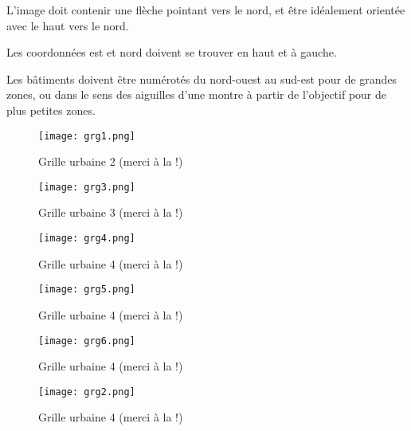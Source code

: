 \begin{e1}
\begin{e2}
\begin{e3}
\begin{e4}
				\begin{e5}
					\item L'image doit contenir une flèche pointant vers le nord, et être idéalement orientée avec le haut vers le nord.
					\item Les coordonnées est et nord doivent se trouver en haut et à gauche.
					\item Les bâtiments doivent être numérotés du nord-ouest au sud-est pour de grandes zones, ou dans le sens des aiguilles d'une montre à partir de l'objectif pour de plus petites zones.
				\end{e5}
				\begin{figure}[H]
					\centering \texttt{[image: grg1.png]} \caption[Grille urbaine 2]{Grille urbaine 2 (merci à la \onethreetwo{}!)} \label{grg1}
				\end{figure}
				\begin{figure}[H]
					\centering \texttt{[image: grg3.png]} \caption[Grille urbaine 3]{Grille urbaine 3 (merci à la \onethreetwo{}!)} \label{grg3}
				\end{figure}
				\begin{figure}[H]
					\centering \texttt{[image: grg4.png]} \caption[Grille urbaine 4]{Grille urbaine 4 (merci à la \onethreetwo{}!)} \label{grg4}
				\end{figure}
				\begin{figure}[H]
					\centering \texttt{[image: grg5.png]} \caption[Grille urbaine 5]{Grille urbaine 4 (merci à la \onethreetwo{}!)} \label{grg5}
				\end{figure}
				\begin{figure}[H]
					\centering \texttt{[image: grg6.png]} \caption[Grille urbaine 6]{Grille urbaine 4 (merci à la \onethreetwo{}!)} \label{grg6}
				\end{figure}
				\begin{figure}[H]
					\centering \texttt{[image: grg2.png]} \caption[Grille urbaine 7]{Grille urbaine 4 (merci à la \onethreetwo{}!)} \label{grg2}
				\end{figure}
				

\end{e4}
\end{e3}
\end{e2}
\end{e1}
